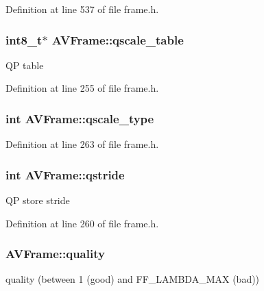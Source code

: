 Definition at line 537 of file frame.\+h.

\subsubsection[{\texorpdfstring{qscale\+\_\+table}{qscale_table}}]{ {\bf int8\+\_\+t}$\ast$ A\+V\+Frame\+::qscale\+\_\+table}\hypertarget{struct_a_v_frame_a6e243e21c69bd4b04f1cf895d5d5f25f}{}\label{struct_a_v_frame_a6e243e21c69bd4b04f1cf895d5d5f25f}
QP table 

Definition at line 255 of file frame.\+h.

\subsubsection[{\texorpdfstring{qscale\+\_\+type}{qscale_type}}]{ {\bf int} A\+V\+Frame\+::qscale\+\_\+type}\hypertarget{struct_a_v_frame_afab492e7a59bec741f2a0194611591b0}{}\label{struct_a_v_frame_afab492e7a59bec741f2a0194611591b0}


Definition at line 263 of file frame.\+h.

\subsubsection[{\texorpdfstring{qstride}{qstride}}]{ {\bf int} A\+V\+Frame\+::qstride}\hypertarget{struct_a_v_frame_ac098b032e02908775f0552178e5465b8}{}\label{struct_a_v_frame_ac098b032e02908775f0552178e5465b8}
QP store stride 

Definition at line 260 of file frame.\+h.

\subsubsection[{\texorpdfstring{quality}{quality}}]{ A\+V\+Frame\+::quality}\hypertarget{struct_a_v_frame_a791c071afd3e95fcae14cb781829754d}{}\label{struct_a_v_frame_a791c071afd3e95fcae14cb781829754d}
quality (between 1 (good) and F\+F\+\_\+\+L\+A\+M\+B\+D\+A\+\_\+\+M\+AX (bad)) 

